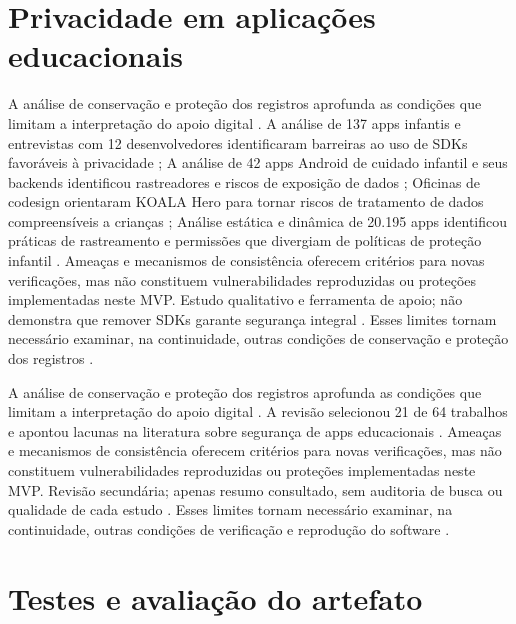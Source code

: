 \clearpage\section{Privacidade em aplicações educacionais}

A análise de conservação e proteção dos registros aprofunda as condições que limitam a interpretação do apoio digital \citep{OS13} \citep{OS14} \citep{OS15} \citep{OS17}. A análise de 137 apps infantis e entrevistas com 12 desenvolvedores identificaram barreiras ao uso de SDKs favoráveis à privacidade \citep{OS13}; A análise de 42 apps Android de cuidado infantil e seus backends identificou rastreadores e riscos de exposição de dados \citep{OS14}; Oficinas de codesign orientaram KOALA Hero para tornar riscos de tratamento de dados compreensíveis a crianças \citep{OS15}; Análise estática e dinâmica de 20.195 apps identificou práticas de rastreamento e permissões que divergiam de políticas de proteção infantil \citep{OS17}. Ameaças e mecanismos de consistência oferecem critérios para novas verificações, mas não constituem vulnerabilidades reproduzidas ou proteções implementadas neste MVP. Estudo qualitativo e ferramenta de apoio; não demonstra que remover SDKs garante segurança integral \citep{OS13} \citep{OS14} \citep{OS15} \citep{OS17}. Esses limites tornam necessário examinar, na continuidade, outras condições de conservação e proteção dos registros \citep{OS13} \citep{OS14} \citep{OS15} \citep{OS17}.

A análise de conservação e proteção dos registros aprofunda as condições que limitam a interpretação do apoio digital \citep{OS18}. A revisão selecionou 21 de 64 trabalhos e apontou lacunas na literatura sobre segurança de apps educacionais \citep{OS18}. Ameaças e mecanismos de consistência oferecem critérios para novas verificações, mas não constituem vulnerabilidades reproduzidas ou proteções implementadas neste MVP. Revisão secundária; apenas resumo consultado, sem auditoria de busca ou qualidade de cada estudo \citep{OS18}. Esses limites tornam necessário examinar, na continuidade, outras condições de verificação e reprodução do software \citep{OS18}.

\clearpage\section{Testes e avaliação do artefato}

